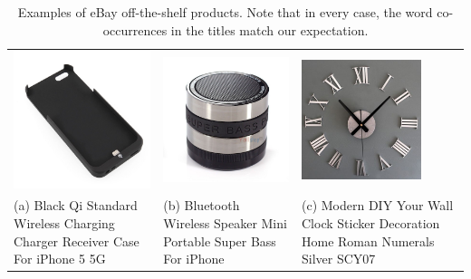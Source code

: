 \begin{table}[t]
\caption{Examples of eBay off-the-shelf products. Note that in every case, the word co-occurrences in the titles match our expectation.}
\label{tab:ebay-standard-products}
\begin{center}
\begin{tabular}{LLL}
\includegraphics[height=4.0cm]{figures/standard-iphone-case.jpg}&\includegraphics[height=4.0cm]{figures/standard-iphone-speaker.jpg}&\includegraphics[height=3.5cm]{figures/standard-clock.jpg}\\
(a) Black Qi Standard Wireless Charging Charger Receiver Case For iPhone 5 5G & (b) Bluetooth Wireless Speaker Mini Portable Super Bass For iPhone & (c) Modern DIY Your Wall Clock Sticker Decoration Home Roman Numerals Silver SCY07\\
\end{tabular}
\end{center}
\end{table}


